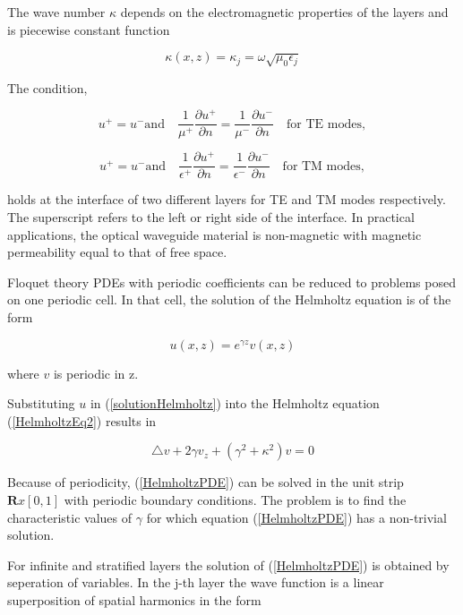 The wave number $\kappa$ depends on the electromagnetic properties of
the layers and is piecewise constant function

\begin{equation}
\kappa(x,z) = \kappa_j = \omega \sqrt{\mu_0 \epsilon_j}
\end{equation}

The condition, 

\begin{equation}
u^+ = u^- \textrm{and} \quad \frac{1}{\mu^+}\frac{\partial{u^+}}{\partial{n}} =
\frac{1}{\mu^-}\frac{\partial{u^-}}{\partial{n}} \quad \textrm{for TE modes},
\end{equation}

\begin{equation}
u^+ = u^- \textrm{and} \quad \frac{1}{\epsilon^+}\frac{\partial{u^+}}{\partial{n}} =
\frac{1}{\epsilon^-}\frac{\partial{u^-}}{\partial{n}} \quad \textrm{for TM modes},
\end{equation}

holds at the interface of two different layers for TE and TM modes
respectively. The superscript refers to the left or right side of the
interface. In practical applications, the optical waveguide material
is non-magnetic with magnetic permeability equal to that of free
space.

Floquet theory PDEs with periodic coefficients can be reduced to
problems posed on one periodic cell. In that cell, the solution of the
Helmholtz equation is of the form

\begin{equation}
u(x,z) = e^{\gamma z} v(x,z)
\label{solutionHelmholtz}
\end{equation}

where $v$ is periodic in z.

Substituting $u$ in (\ref{solutionHelmholtz}) into the Helmholtz
equation (\ref{HelmholtzEq2}) results in

\begin{equation}
\triangle v + 2 \gamma v_z + (\gamma^2 + \kappa^2)v = 0
\label{HelmholtzPDE}
\end{equation}

Because of periodicity, (\ref{HelmholtzPDE}) can be solved in the unit
strip $\mathbf{R} x [0,1]$ with periodic boundary conditions. The
problem is to find the characteristic values of $\gamma$ for which
equation (\ref{HelmholtzPDE}) has a non-trivial solution.

For infinite and stratified layers the solution of
(\ref{HelmholtzPDE}) is obtained by seperation of variables. In the
j-th layer the wave function is a linear superposition of spatial
harmonics in the form

